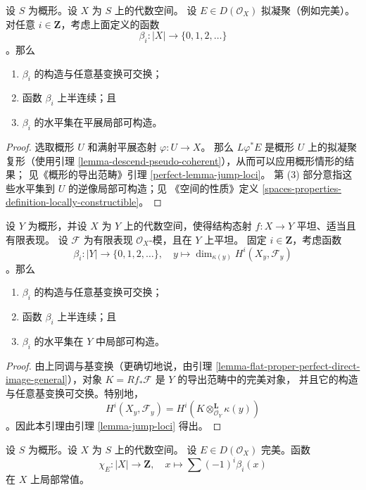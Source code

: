 \begin{lemma}
\label{lemma-jump-loci}
设 $S$ 为概形。设 $X$ 为 $S$ 上的代数空间。
设 $E \in D(\mathcal{O}_X)$ 拟凝聚（例如完美）。
对任意 $i \in \mathbf{Z}$，考虑上面定义的函数
$$
\beta_i : |X| \longrightarrow \{0, 1, 2, \ldots\}
$$
。那么
\begin{enumerate}
\item $\beta_i$ 的构造与任意基变换可交换；
\item 函数 $\beta_i$ 上半连续；且
\item $\beta_i$ 的水平集在平展局部可构造。
\end{enumerate}
\end{lemma}

\begin{proof}
选取概形 $U$ 和满射平展态射 $\varphi : U \to X$。
那么 $L\varphi^*E$ 是概形 $U$ 上的拟凝聚复形（使用引理
\ref{lemma-descend-pseudo-coherent}），从而可以应用概形情形的结果；
见《概形的导出范畴》引理 \ref{perfect-lemma-jump-loci}。
第 (3) 部分意指这些水平集到 $U$ 的逆像局部可构造；见
《空间的性质》定义
\ref{spaces-properties-definition-locally-constructible}。
\end{proof}

\begin{lemma}
\label{lemma-jump-loci-geometric}
设 $Y$ 为概形，并设 $X$ 为 $Y$ 上的代数空间，使得结构态射
$f : X \to Y$ 平坦、适当且有限表现。
设 $\mathcal{F}$ 为有限表现 $\mathcal{O}_X$-模，且在 $Y$ 上平坦。
固定 $i \in \mathbf{Z}$，考虑函数
$$
\beta_i : |Y| \to \{0, 1, 2, \ldots\},\quad
y \longmapsto \dim_{\kappa(y)} H^i(X_y, \mathcal{F}_y)
$$
。那么
\begin{enumerate}
\item $\beta_i$ 的构造与任意基变换可交换；
\item 函数 $\beta_i$ 上半连续；且
\item $\beta_i$ 的水平集在 $Y$ 中局部可构造。
\end{enumerate}
\end{lemma}

\begin{proof}
由上同调与基变换（更确切地说，由引理
\ref{lemma-flat-proper-perfect-direct-image-general}），对象
$K = Rf_*\mathcal{F}$ 是 $Y$ 的导出范畴中的完美对象，
并且它的构造与任意基变换可交换。特别地，
$$
H^i(X_y, \mathcal{F}_y) = H^i(K \otimes_{\mathcal{O}_Y}^\mathbf{L} \kappa(y))
$$
。因此本引理由引理 \ref{lemma-jump-loci} 得出。
\end{proof}

\begin{lemma}
\label{lemma-chi-locally-constant}
设 $S$ 为概形。设 $X$ 为 $S$ 上的代数空间。
设 $E \in D(\mathcal{O}_X)$ 完美。函数
$$
\chi_E : |X| \longrightarrow \mathbf{Z},\quad
x \longmapsto \sum (-1)^i \beta_i(x)
$$
在 $X$ 上局部常值。
\end{lemma}

